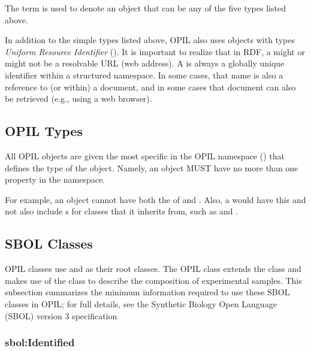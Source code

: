 The term  is used to denote an object that can be any of the five types listed above.

In addition to the simple types listed above, OPIL also uses objects with types \emph{Uniform Resource Identifier} (). It is important to realize that in RDF, a  might or might not be a resolvable URL (web address).  A  is always a globally unique identifier within a structured namespace.  In some cases, that name is also a reference to (or within) a document, and in some cases that document can also be retrieved (e.g., using a web browser).

\subsection{OPIL Types}
\label{sec:sbolTypes}

All OPIL objects are given the most specific  in the OPIL namespace () that defines the type of the object.  Namely, an object MUST have no more than one  property in the  namespace.

For example, an object cannot have both the  of  and .  Also, a  would have this  and not also include s for classes that it inherits from, such as  and .

\subsection{SBOL Classes}

OPIL classes use  and  as their root classes.
The OPIL  class extends the  class and makes use of the  class to describe the composition of experimental samples.
This subsection summarizes the minimum information required to use these SBOL classes in OPIL; for full details, see the Synthetic Biology Open Language (SBOL) version 3 specification~\citep{SBOL3}

\subsubsection{sbol:Identified}
\label{sec:sbol:Identified}

